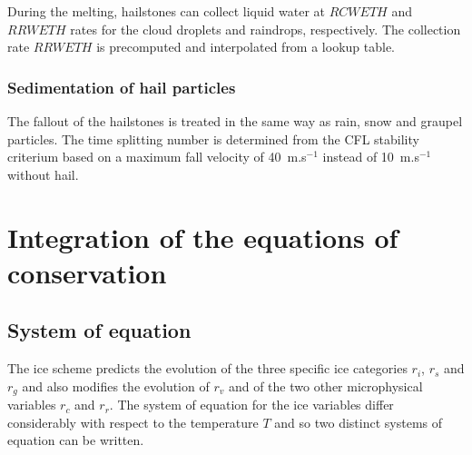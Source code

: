 During the melting, hailstones can collect liquid water at $RCWETH$ and $RRWETH$ rates for the cloud droplets and raindrops, respectively. The collection rate $RRWETH$ is precomputed and interpolated from a lookup table.

%
\subsubsection{Sedimentation of hail particles}
%

The fallout of the hailstones is treated in the same way as rain, snow and graupel particles. The time splitting number is determined from the CFL stability criterium based on a maximum fall velocity of 40~m.s$^{-1}$ instead of 10~m.s$^{-1}$ without hail.


%
\section{Integration of the equations of conservation}
%

%
\subsection{System of equation}
%
The ice scheme predicts the evolution of the three specific ice categories
$r_i$, $r_s$ and $r_g$ and also modifies the evolution of $r_v$ and of the two
other microphysical variables $r_c$ and $r_r$.
The system of equation for the ice variables differ considerably with respect to
the temperature $T$ and so two distinct systems of equation can be written.

